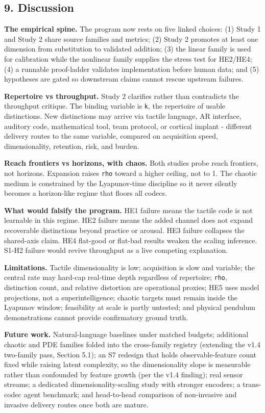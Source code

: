 \documentclass[
  11pt,
]{article}
\begin{document}
\subsection{9. Discussion}\label{discussion}

\textbf{The empirical spine.} The program now rests on
five linked choices: (1) Study 1 and Study 2 share
source families and metrics; (2) Study 2 promotes at
least one dimension from substitution to validated
addition; (3) the linear family is used for calibration
while the nonlinear family supplies the stress test for
HE2/HE4; (4) a runnable proof-ladder validates
implementation before human data; and (5) hypotheses
are gated so downstream claims cannot rescue upstream
failures.

\textbf{Repertoire vs throughput.} Study 2 clarifies
rather than contradicts the throughput critique. The
binding variable is \texttt{k}, the repertoire of
usable distinctions. New distinctions may arrive via
tactile language, AR interface, auditory code,
mathematical tool, team protocol, or cortical implant -
different delivery routes to the same variable,
compared on acquisition speed, dimensionality,
retention, risk, and burden.

\textbf{Reach frontiers vs horizons, with chaos.} Both
studies probe reach frontiers, not horizons. Expansion
raises \texttt{rho} toward a higher ceiling, not to 1.
The chaotic medium is constrained by the Lyapunov-time
discipline so it never silently becomes a horizon-like
regime that floors all codecs.

\textbf{What would falsify the program.} HE1 failure
means the tactile code is not learnable in this regime.
HE2 failure means the added channel does not expand
recoverable distinctions beyond practice or arousal.
HE3 failure collapses the shared-axis claim. HE4
flat-good or flat-bad results weaken the scaling
inference. S1-H2 failure would revive throughput as a
live competing explanation.

\textbf{Limitations.} Tactile dimensionality is low;
acquisition is slow and variable; the central rate may
hard-cap real-time depth regardless of repertoire;
\texttt{rho}, distinction count, and relative
distortion are operational proxies; HE5 uses model
projections, not a superintelligence; chaotic targets
must remain inside the Lyapunov window; feasibility at
scale is partly untested; and physical pendulum
demonstrations cannot provide confirmatory ground
truth.

\textbf{Future work.} Natural-language baselines under
matched budgets; additional chaotic and PDE families
folded into the cross-family registry (extending the
v1.4 two-family pass, Section 5.1); an S7 redesign that
holds observable-feature count fixed while raising
latent complexity, so the dimensionality slope is
measurable rather than confounded by feature growth
(per the v1.4 finding); real sensor streams; a
dedicated dimensionality-scaling study with stronger
encoders; a trans-codec agent benchmark; and
head-to-head comparison of non-invasive and invasive
delivery routes once both are mature.
\end{document}
